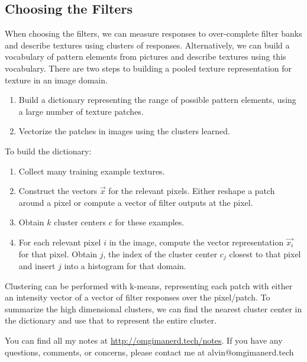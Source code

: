 \documentclass{math}
\begin{document}
\subsection*{Choosing the Filters}
When choosing the filters, we can measure responses to over-complete filter
banks and describe textures using clusters of responses. Alternatively, we can
build a vocabulary of pattern elements from pictures and describe textures using
this vocabulary. There are two steps to building a pooled texture representation
for texture in an image domain.
\begin{enumerate}
  \item Build a dictionary representing the range of possible pattern elements,
    using a large number of texture patches.
  \item Vectorize the patches in images using the clusters learned.
\end{enumerate}
To build the dictionary:
\begin{enumerate}
  \item Collect many training example textures.
  \item Construct the vectors \( \vec{x} \) for the relevant pixels. Either
    reshape a patch around a pixel or compute a vector of filter outputs
    at the pixel.
  \item Obtain \( k \) cluster centers \( c \) for these examples.
  \item For each relevant pixel \( i \) in the image, compute the vector
    representation \( \vec{x_i} \) for that pixel. Obtain \( j \), the index
    of the cluster center \( c_j \) closest to that pixel and insert \( j \)
    into a histogram for that domain.
\end{enumerate}
Clustering can be performed with k-means, representing each patch with either
an intensity vector of a vector of filter responses over the pixel/patch.
To summarize the high dimensional clusters, we can find the nearest cluster
center in the dictionary and use that to represent the entire cluster.

\begin{center}
  You can find all my notes at \url{http://omgimanerd.tech/notes}. If you have
  any questions, comments, or concerns, please contact me at
  alvin@omgimanerd.tech
\end{center}
\end{document}
